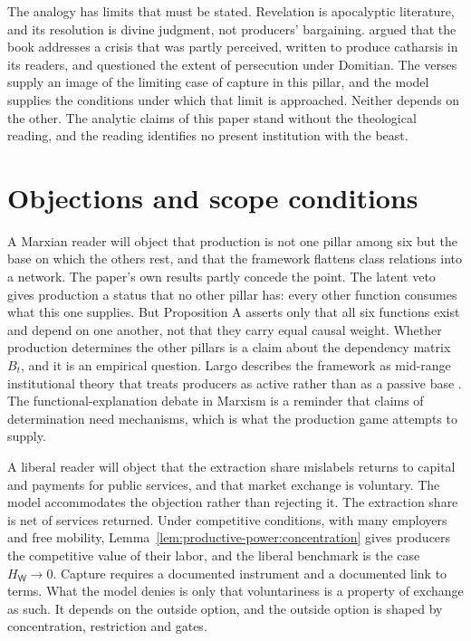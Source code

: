 \documentclass[11pt,letterpaper]{article}
\theoremstyle{definition}
\theoremstyle{remark}
\newcommand{\pW}{\mathsf{W}}
\newcommand{\HW}{H_{\pW}}
\begin{document}
The analogy has limits that must be stated. Revelation is apocalyptic literature, and its resolution is divine judgment, not producers' bargaining. \citet{collins1984} argued that the book addresses a crisis that was partly perceived, written to produce catharsis in its readers, and \citet{thompson1990} questioned the extent of persecution under Domitian. The verses supply an image of the limiting case of capture in this pillar, and the model supplies the conditions under which that limit is approached. Neither depends on the other. The analytic claims of this paper stand without the theological reading, and the reading identifies no present institution with the beast.

\section{Objections and scope conditions}
\label{sec:objections}

A Marxian reader will object that production is not one pillar among six but the base on which the others rest, and that the framework flattens class relations into a network. The paper's own results partly concede the point. The latent veto gives production a status that no other pillar has: every other function consumes what this one supplies. But Proposition A asserts only that all six functions exist and depend on one another, not that they carry equal causal weight. Whether production determines the other pillars is a claim about the dependency matrix $B_t$, and it is an empirical question. Largo describes the framework as mid-range institutional theory that treats producers as active rather than as a passive base \citep{largo2026hbs}. The functional-explanation debate in Marxism \citep{cohen1978,elster1985} is a reminder that claims of determination need mechanisms, which is what the production game attempts to supply.

A liberal reader will object that the extraction share mislabels returns to capital and payments for public services, and that market exchange is voluntary. The model accommodates the objection rather than rejecting it. The extraction share is net of services returned. Under competitive conditions, with many employers and free mobility, Lemma~\ref{lem:productive-power:concentration} gives producers the competitive value of their labor, and the liberal benchmark is the case $\HW\to 0$. Capture requires a documented instrument and a documented link to terms. What the model denies is only that voluntariness is a property of exchange as such. It depends on the outside option, and the outside option is shaped by concentration, restriction and gates.
\end{document}
